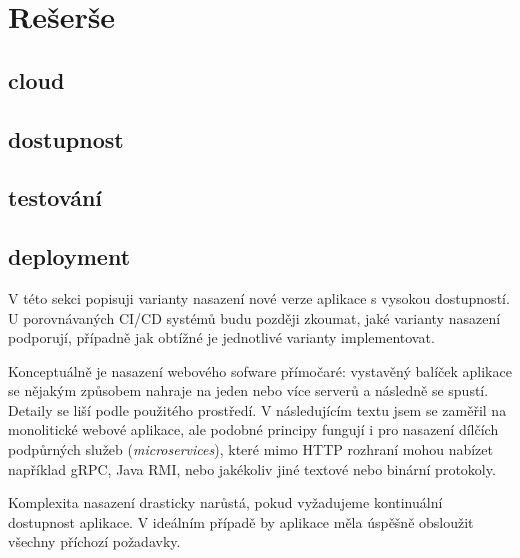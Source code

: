 \chapter{Rešerše}
    \blind[4]

    \section{cloud}
        \blind[2]

    \section{dostupnost}
        \blind[3]

    \section{testování}
        \blind[4]

    \section{deployment}
        \blind[1]

        V této sekci popisuji varianty nasazení nové verze aplikace s vysokou dostupností. U porovnávaných CI/CD systémů budu později zkoumat, jaké varianty nasazení podporují, případně jak obtížné je jednotlivé varianty implementovat.

        Konceptuálně je nasazení webového sofware přímočaré: vystavěný balíček aplikace se nějakým způsobem nahraje na jeden nebo více serverů a následně se spustí. Detaily se liší podle použitého prostředí. V následujícím textu jsem se zaměřil na monolitické webové aplikace, ale podobné principy fungují i pro nasazení dílčích podpůrných služeb (\textit{microservices}), které mimo HTTP rozhraní mohou nabízet například gRPC, Java RMI, nebo jakékoliv jiné textové nebo binární protokoly.

        Komplexita nasazení drasticky narůstá, pokud vyžadujeme kontinuální dostupnost aplikace. V ideálním případě by aplikace měla úspěšně obsloužit všechny příchozí požadavky.

